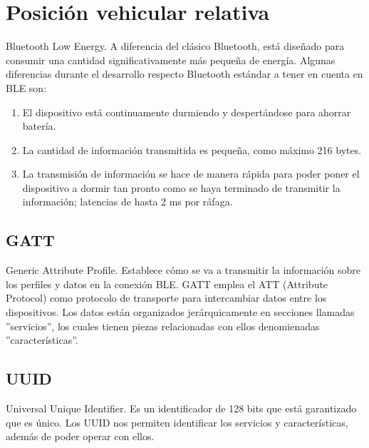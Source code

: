 \section{Posición vehicular relativa}
Bluetooth Low Energy. A diferencia del clásico Bluetooth, está diseñado para consumir una cantidad significativamente más pequeña de energía. Algunas diferencias durante el desarrollo respecto Bluetooth estándar a tener en cuenta en BLE son:
\begin{enumerate}
	\item El dispositivo está continuamente durmiendo y despertándose para ahorrar batería.
	\item La cantidad de información transmitida es pequeña, como máximo 216 bytes.
	\item La transmisión de información se hace de manera rápida para poder poner el dispositivo a dormir tan pronto como se haya terminado de transmitir la información; latencias de hasta 2 ms por ráfaga.
\end{enumerate}

\subsection{GATT}
Generic Attribute Profile. Establece cómo se va a transmitir la información sobre los perfiles y datos en la conexión BLE. GATT emplea el ATT (Attribute Protocol) como protocolo de transporte para intercambiar datos entre los dispositivos. Los datos están organizados jerárquicamente en secciones llamadas ''servicios'', los cuales tienen piezas relacionadas con ellos denomienadas ''características''.

\subsection{UUID}
Universal Unique Identifier. Es un identificador de 128 bits que está garantizado que es único. Los UUID nos permiten identificar los servicios y características, además de poder operar con ellos.